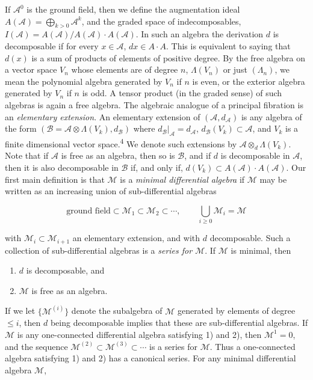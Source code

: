 \documentclass[
  english,
  a3paper,
  a3paper]{extarticle}
\begin{document}
If \(\mathscr A^0\) is the ground field, then we define the augmentation
ideal \(A(\mathscr A)=\bigoplus_{k>0}\mathscr A^k\), and the graded
space of indecomposables,
\(I(\mathscr A)=A(\mathscr A)/A(\mathscr A)\cdot A(\mathscr A)\). In
such an algebra the derivation \(d\) is decomposable if for every
\(x\in\mathscr A\), \(dx\in A\cdot A\). This is equivalent to saying
that \(d(x)\) is a sum of products of elements of positive degree. By
the free algebra on a vector space \(V_n\) whose elements are of degree
\(n\), \(\Lambda(V_n)\) or just \((\Lambda_n)\), we mean the polynomial
algebra generated by \(V_n\) if \(n\) is even, or the exterior algebra
generated by \(V_n\) if \(n\) is odd. A tensor product (in the graded
sense) of such algebras is again a free algebra. The algebraic analogue
of a principal fibration is an \emph{elementary extension}. An
elementary extension of \((\mathscr A,d_{\mathscr A})\) is any algebra
of the form
\((\mathscr B=\mathscr A\otimes\Lambda(V_k),d_{\mathscr B})\) where
\(d_{\mathscr B}|_{\mathscr A}=d_{\mathscr A}\),
\(d_{\mathscr B}(V_k)\subset\mathscr A\), and \(V_k\) is a finite
dimensional vector space.\textsuperscript{4} We denote such extensions
by \(\mathscr A\otimes_d\Lambda(V_k)\). Note that if \(\mathscr A\) is
free as an algebra, then so is \(\mathscr B\), and if \(d\) is
decomposable in \(\mathscr A\), then it is also decomposable in
\(\mathscr B\) if, and only if,
\(d(V_k)\subset A(\mathscr A)\cdot A(\mathscr A)\). Our first main
definition is that \(\mathcal M\) is a \emph{minimal differential
algebra} if \(\mathcal M\) may be written as an increasing union of
sub-differential algebras

\[
\text{ground field}\subset\mathcal M_1\subset\mathcal M_2\subset\cdots,\qquad \bigcup_{i\ge0}\mathcal M_i=\mathcal M
\]

with \(\mathcal M_i\subset\mathcal M_{i+1}\) an elementary extension,
and with \(d\) decomposable. Such a collection of sub-differential
algebras is a \emph{series for \(\mathcal M\)}. If \(\mathcal M\) is
minimal, then

\begin{enumerate}
\def\labelenumi{\arabic{enumi})}
\item
  \(d\) is decomposable, and
\item
  \(\mathcal M\) is free as an algebra.
\end{enumerate}

If we let \(\{\mathcal M^{(i)}\}\) denote the subalgebra of
\(\mathcal M\) generated by elements of degree \(\le i\), then \(d\)
being decomposable implies that these are sub-differential algebras. If
\(\mathcal M\) is any one-connected differential algebra satisfying 1)
and 2), then \(\mathcal M^1=0\), and the sequence
\(\mathcal M^{(2)}\subset\mathcal M^{(3)}\subset\cdots\) is a series for
\(\mathcal M\). Thus a one-connected algebra satisfying 1) and 2) has a
canonical series. For any minimal differential algebra \(\mathcal M\),
\end{document}
